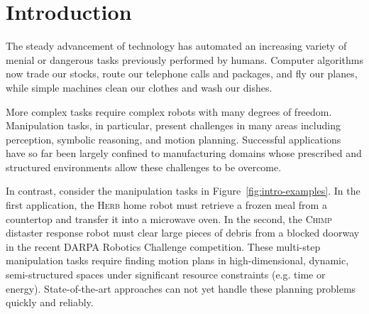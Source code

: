 \chapter{Introduction}

The steady advancement of technology
has automated an increasing variety of menial or dangerous tasks
previously performed by humans.
Computer algorithms now trade our stocks,
route our telephone calls and packages,
and fly our planes,
while simple machines clean our clothes and wash our dishes.

More complex tasks require complex robots with many
degrees of freedom.
Manipulation tasks, in particular,
present challenges in many areas including
perception, symbolic reasoning, and motion planning.
Successful applications have so far been largely
confined to manufacturing domains
whose prescribed and structured environments
allow these challenges to be overcome.

In contrast,
consider the manipulation tasks in Figure~\ref{fig:intro-examples}.
In the first application,
the \textsc{Herb} home robot must retrieve a frozen meal from 
a countertop %
and transfer it into a microwave oven.
In the second,
the \textsc{Chimp} distaster response robot
must clear large pieces of debris from a blocked doorway
in the recent DARPA Robotics Challenge competition.
These multi-step manipulation tasks
require finding motion plans in
high-dimensional, dynamic, semi-structured spaces
under significant resource constraints (e.g. time or energy).
State-of-the-art approaches can not yet handle these
planning problems quickly and reliably.

